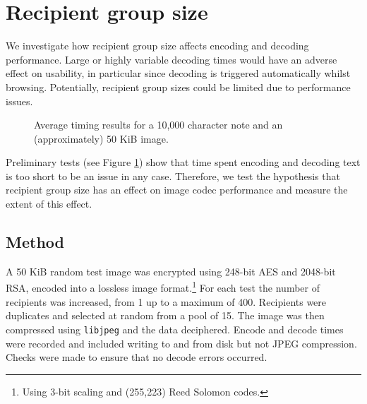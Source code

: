 \FloatBarrier
\section{Recipient group size}
\label{sec:recsize}

We investigate how recipient group size affects encoding and decoding performance. Large or highly variable decoding times would have an adverse effect on usability, in particular since decoding is triggered automatically whilst browsing. Potentially, recipient group sizes could be limited due to performance issues.

\begin{figure}[tbph]
    \begin{center}
    \caption{Average timing results for a 10,000 character note and an (approximately) 50 KiB image.}
    \label{graph:txt-sync}
  \end{center}
\end{figure}

Preliminary tests (see Figure \ref{graph:txt-sync}) show that time spent encoding and decoding text is too short to be an issue in any case. Therefore, we test the hypothesis that recipient group size has an  effect on image codec performance and measure the extent of this effect.



\subsection{Method}

A 50 KiB random test image was encrypted using 248-bit AES and 2048-bit RSA, encoded into a lossless image format.\footnote{Using 3-bit scaling and (255,223) Reed Solomon codes.} For each test the number of recipients was increased, from 1 up to a maximum of 400. Recipients were duplicates and selected at random from a pool of 15. The image was then compressed using {\tt libjpeg} and the data deciphered. Encode and decode times were recorded and included writing to and from disk but not JPEG compression. Checks were made to ensure that no decode errors occurred.

